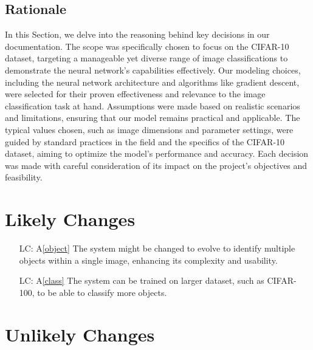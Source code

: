 \documentclass[12pt]{article}
\newcommand{\aref}[1]{A\ref{#1}}
\newcounter{lcnum} %
\begin{document}
\subsection{Rationale}

In this Section, we delve into the reasoning behind key decisions in our documentation. 
The scope was specifically chosen to focus on the CIFAR-10 dataset, targeting a manageable 
yet diverse range of image classifications to demonstrate the neural network's capabilities 
effectively. Our modeling choices, including the neural network architecture and algorithms 
like gradient descent, were selected for their proven effectiveness and relevance to the 
image classification task at hand. Assumptions were made based on realistic scenarios and 
limitations, ensuring that our model remains practical and applicable. The typical 
values chosen, such as image dimensions and parameter settings, were guided by 
standard practices in the field and the specifics of the CIFAR-10 dataset, aiming to 
optimize the model's performance and accuracy. Each decision was made with careful 
consideration of its impact on the project's objectives and feasibility.


\section{Likely Changes}    

\noindent \begin{itemize}

\item[LC\refstepcounter{lcnum}\thelcnum\label{LC_object}:] 
\aref{object} The system might be changed to evolve to identify multiple objects within a 
single image, enhancing its complexity and usability.

\item[LC\refstepcounter{lcnum}\thelcnum\label{LC_class}:] 
\aref{class} The system can be trained on larger dataset, such as CIFAR-100, 
to be able to classify more objects.


\end{itemize}

\section{Unlikely Changes}    
\end{document}
